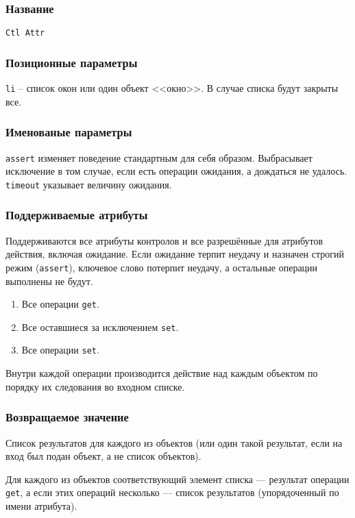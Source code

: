\documentclass[11pt]{book} %
\begin{document}
\subsubsection*{Название} 
\verb"Ctl Attr"

\subsubsection*{Позиционные параметры} 
\verb"li" -- список окон или один объект <<окно>>. В случае списка будут закрыты все.

\subsubsection*{Именованые параметры} 
\verb"assert" изменяет поведение стандартным для себя образом. Выбрасывает исключение в том случае, если есть операции ожидания, а дождаться не удалось.
\verb"timeout" указывает величину ожидания.

\subsubsection*{Поддерживаемые атрибуты} 

Поддерживаются все атрибуты контролов и все разрешённые для атрибутов действия, включая ожидание. Если ожидание терпит неудачу и назначен строгий режим (\verb|assert|), ключевое слово потерпит неудачу, а остальные операции выполнены не будут.
\begin{enumerate}
\item Все операции \verb|get|.
\item Все оставшиеся за исключением \verb|set|.
\item Все операции \verb|set|.
\end{enumerate}

Внутри каждой операции производится действие над каждым объектом по порядку их следования во входном списке.

\subsubsection*{Возвращаемое значение} 
Список результатов для каждого из объектов (или один такой результат, если на вход был подан объект, а не список объектов).

Для каждого из объектов соответствующий элемент списка --- результат операции \verb|get|, а если этих операций несколько --- список результатов (упорядоченный по имени атрибута).
\end{document}

